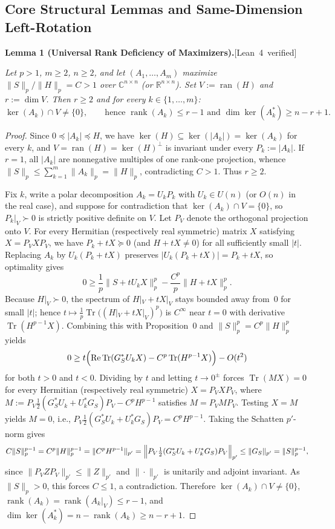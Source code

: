 \documentclass[10pt,letterpaper]{article}
\newcommand{\leanbadge}[1]{\mbox{\sffamily\scriptsize\color{leanborder}[#1]}}
\newcommand{\C}{\mathbb{C}}
\newcommand{\R}{\mathbb{R}}
\newcommand{\Tr}{\operatorname{Tr}}
\newcommand{\ran}{\operatorname{ran}}
\newcommand{\rank}{\operatorname{rank}}
\begin{document}
\subsection{Core Structural Lemmas and Same-Dimension Left-Rotation}

\begin{tcolorbox}[lemmabox]
\textbf{Lemma 1 (Universal Rank Deficiency of Maximizers).}\hfill\leanbadge{Lean~4 verified}\par\vspace{1.5pt}
\emph{Let $p > 1$, $m \ge 2$, $n \ge 2$, and let $(A_1,\dots,A_m)$ maximize $\|S\|_p / \|H\|_p = C > 1$ over $\C^{n\times n}$ (or $\R^{n\times n}$). Set $V := \ran(H)$ and $r := \dim V$. Then $r \ge 2$ and for every $k \in \{1,\dots,m\}$:}
\[
  \ker(A_k) \cap V \neq \{0\}, \qquad \text{hence } \rank(A_k) \le r - 1 \text{ and } \dim\ker(A_k^*) \ge n - r + 1.
\]
\end{tcolorbox}

\begin{proof}
Since $0 \preceq |A_k| \preceq H$, we have $\ker(H) \subseteq \ker(|A_k|) = \ker(A_k)$ for every $k$, and $V = \ran(H) = \ker(H)^\perp$ is invariant under every $P_k := |A_k|$. If $r = 1$, all $|A_k|$ are nonnegative multiples of one rank-one projection, whence $\|S\|_p \le \sum_{k=1}^m \|A_k\|_p = \|H\|_p$, contradicting $C > 1$. Thus $r \ge 2$.

Fix $k$, write a polar decomposition $A_k = U_k P_k$ with $U_k \in U(n)$ (or $O(n)$ in the real case), and suppose for contradiction that $\ker(A_k) \cap V = \{0\}$, so $P_k|_V \succ 0$ is strictly positive definite on $V$. Let $P_V$ denote the orthogonal projection onto $V$. For every Hermitian (respectively real symmetric) matrix $X$ satisfying $X = P_V X P_V$, we have $P_k + tX \succeq 0$ (and $H + tX \neq 0$) for all sufficiently small $|t|$. Replacing $A_k$ by $U_k(P_k + tX)$ preserves $|U_k(P_k + tX)| = P_k + tX$, so optimality gives
\[
  0 \ge \frac{1}{p}\|S + t U_k X\|_p^p - \frac{C^p}{p}\|H + tX\|_p^p.
\]
Because $H|_V \succ 0$, the spectrum of $H|_V + tX|_V$ stays bounded away from~$0$ for small $|t|$; hence $t \mapsto \frac{1}{p}\Tr\bigl((H|_V + tX|_V)^p\bigr)$ is $C^\infty$ near $t = 0$ with derivative $\Tr(H^{p-1} X)$. Combining this with Proposition~0 and $\|S\|_p^p = C^p \|H\|_p^p$ yields
\[
  0 \ge t\Bigl(\operatorname{Re}\Tr(G_S^* U_k X) - C^p \Tr(H^{p-1} X)\Bigr) - O(t^2)
\]
for both $t > 0$ and $t < 0$. Dividing by $t$ and letting $t \to 0^{\pm}$ forces $\Tr(M X) = 0$ for every Hermitian (respectively real symmetric) $X = P_V X P_V$, where $M := P_V\frac{1}{2}(G_S^* U_k + U_k^* G_S)P_V - C^p H^{p-1}$ satisfies $M = P_V M P_V$. Testing $X = M$ yields $M = 0$, i.e., $P_V\frac{1}{2}(G_S^* U_k + U_k^* G_S)P_V = C^p H^{p-1}$. Taking the Schatten $p'$-norm gives
\[
  C\|S\|_p^{p-1} = C^p \|H\|_p^{p-1} = \|C^p H^{p-1}\|_{p'} = \Bigl\|P_V\tfrac{1}{2}(G_S^* U_k + U_k^* G_S)P_V\Bigr\|_{p'} \le \|G_S\|_{p'} = \|S\|_p^{p-1},
\]
since $\|P_V Z P_V\|_{p'} \le \|Z\|_{p'}$ and $\|\cdot\|_{p'}$ is unitarily and adjoint invariant. As $\|S\|_p > 0$, this forces $C \le 1$, a contradiction. Therefore $\ker(A_k) \cap V \neq \{0\}$, $\rank(A_k) = \rank(A_k|_V) \le r - 1$, and $\dim\ker(A_k^*) = n - \rank(A_k) \ge n - r + 1$.
\end{proof}
\end{document}
